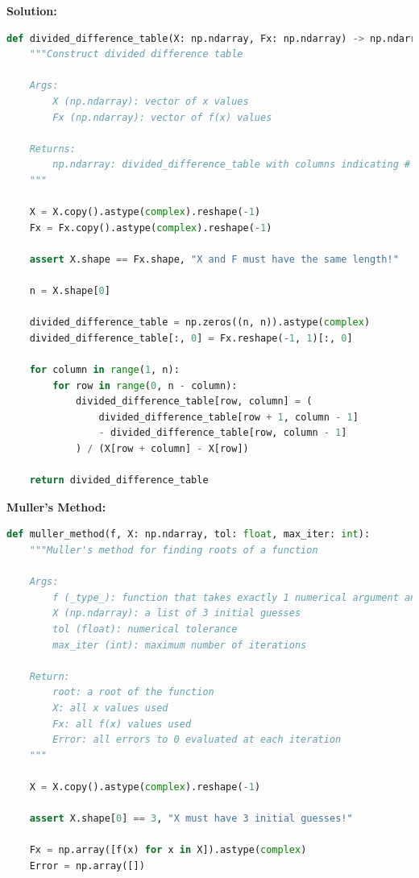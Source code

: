 \documentclass[conference,onecolumn]{IEEEtran}
\begin{document}
\begin{enumerate}[label=\arabic{enumi}.]
\begin{enumerate}
                    \textbf{Solution:}
                    \begin{lstlisting}[language=Python]
def divided_difference_table(X: np.ndarray, Fx: np.ndarray) -> np.ndarray:
    """Construct divided difference table

    Args:
        X (np.ndarray): vector of x values
        Fx (np.ndarray): vector of f(x) values

    Returns:
        np.ndarray: divided_difference_table with columns indicating # of x values used, rows indicating leading x index
    """

    X = X.copy().astype(complex).reshape(-1)
    Fx = Fx.copy().astype(complex).reshape(-1)

    assert X.shape == Fx.shape, "X and F must have the same length!"

    n = X.shape[0]

    divided_difference_table = np.zeros((n, n)).astype(complex)
    divided_difference_table[:, 0] = Fx.reshape(-1, 1)[:, 0]

    for column in range(1, n):
        for row in range(0, n - column):
            divided_difference_table[row, column] = (
                divided_difference_table[row + 1, column - 1]
                - divided_difference_table[row, column - 1]
            ) / (X[row + column] - X[row])

    return divided_difference_table
                    \end{lstlisting}

                    \textbf{Muller's Method:}
                    \begin{lstlisting}[language=Python]
def muller_method(f, X: np.ndarray, tol: float, max_iter: int):
    """Muller's method for finding roots of a function

    Args:
        f (_type_): function that takes exactly 1 numerical argument and output a numerical value
        X (np.ndarray): a list of 3 initial guesses
        tol (float): numerical tolerance
        max_iter (int): maximum number of iterations

    Return:
        root: a root of the function
        X: all x values used
        Fx: all f(x) values used
        Error: all errors to 0 evaluated at each iteration
    """

    X = X.copy().astype(complex).reshape(-1)

    assert X.shape[0] == 3, "X must have 3 initial guesses!"

    Fx = np.array([f(x) for x in X]).astype(complex)
    Error = np.array([])


\end{lstlisting}
\end{enumerate}
\end{enumerate}
\end{document}
